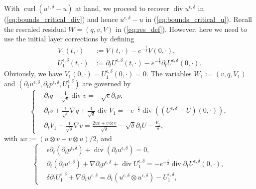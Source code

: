 \documentclass[reqno,10pt]{amsart}
\theoremstyle{definition}
\theoremstyle{remark}
\numberwithin{equation}{section}
\DeclareMathOperator{\dive}{div}
\DeclareMathOperator{\curl}{curl}
\begin{document}
With $\curl (u^{\epsilon,\delta}-u)$ at hand, we proceed to recover $\dive u^{\epsilon,\delta}$ in (\ref{eq:bounds_critical_div}) and hence $u^{\epsilon,\delta}-u$ in (\ref{eq:bounds_critical_u}). Recall the rescaled residual $W=(q,v,V)$ in (\ref{eq:res_def}). However, here we need to use the initial layer corrections by defining
\begin{subequations} \label{eq:init_layer_correct}
\begin{align}
    V_1(t,\cdot) &:= V(t,\cdot) - e^{-\frac{t}{\delta}}V(0,\cdot), \\
    U_1^{\epsilon,\delta}(t,\cdot) &:= \partial_t U^{\epsilon,\delta}(t,\cdot) - e^{-\frac{t}{\delta}} \partial_t U^{\epsilon,\delta}(0,\cdot). \label{eq:init_correct_U1}
\end{align}
\end{subequations}
Obviously, we have $V_1(0,\cdot)=U_1^{\epsilon,\delta}(0,\cdot)=0$. The variables $W_1:=(v,q,V_1)$ and $(\partial_t u^{\epsilon,\delta},  \partial_t p^{\epsilon,\delta}, U^{\epsilon,\delta}_1)$ are governed by
\begin{equation} \label{eq:init_layer_1}
\left\{
\begin{aligned}
    & \partial_t q + \frac{1}{\sqrt\epsilon} \dive v = -\sqrt\epsilon \partial_t p, \\
    & \partial_t v+ \frac{1}{\sqrt\epsilon}\nabla q + \frac{1}{\sqrt\delta} \dive V_1 = -e^{-\frac{t}{\delta}}\dive ((U^{\epsilon,\delta}-U)(0,\cdot)), \\
    & \partial_t V_1 + \frac{1}{\sqrt\delta} \nabla v = \frac{2uv+v\otimes v}{\sqrt\delta} - \sqrt\delta \partial_t U -\frac{V_1}{\delta},
\end{aligned}
\right.
\end{equation}
with $uv := (u\otimes v+v\otimes u)/2$, and
\begin{equation} \label{eq:init_layer_2}
\left\{
\begin{aligned}
    &\epsilon \partial_t \left(\partial_t p^{\epsilon,\delta}\right) + \dive \left(\partial_t u^{\epsilon,\delta}\right) = 0, \\
    &\partial_t \left(\partial_t u^{\epsilon,\delta}\right) + \nabla \partial_t p^{\epsilon,\delta} + \dive U_1^{\epsilon,\delta} = -e^{-\frac{t}{\delta}}\dive \partial_t U^{\epsilon,\delta}(0,\cdot), \\
    &\delta \partial_t U_1^{\epsilon,\delta} + \nabla \partial_t u^{\epsilon,\delta} = \partial_t \left(u^{\epsilon,\delta}\otimes u^{\epsilon,\delta}\right) - U_1^{\epsilon,\delta},
\end{aligned}
\right.
\end{equation}
\end{document}
